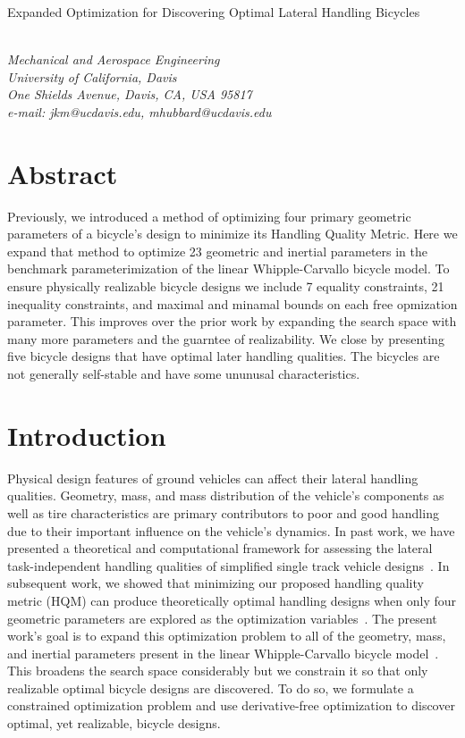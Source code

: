 \documentclass{bmd2019p}
\begin{document}
\begin{flushleft}
{\fontsize{16pt}{20pt}\selectfont%
  Expanded Optimization for Discovering Optimal Lateral Handling Bicycles}
\end{flushleft}

\begin{flushleft}
  {\\}
  \textit{Mechanical and Aerospace Engineering\\
          University of California, Davis\\
          One Shields Avenue, Davis, CA, USA 95817\\
          e-mail: jkm@ucdavis.edu, mhubbard@ucdavis.edu}
\end{flushleft}

\section*{Abstract}
%
Previously, we introduced a method of optimizing four primary geometric
parameters of a bicycle's design to minimize its Handling Quality Metric. Here
we expand that method to optimize 23 geometric and inertial parameters in the
benchmark parameterimization of the linear Whipple-Carvallo bicycle model. To
ensure physically realizable bicycle designs we include 7 equality constraints,
21 inequality constraints, and maximal and minamal bounds on each free
opmization parameter. This improves over the prior work by expanding the search
space with many more parameters and the guarntee of realizability. We close by
presenting five bicycle designs that have optimal later handling qualities. The
bicycles are not generally self-stable and have some ununusal characteristics.

\section{Introduction}
%
Physical design features of ground vehicles can affect their lateral handling
qualities. Geometry, mass, and mass distribution of the vehicle's components as
well as tire characteristics are primary contributors to poor and good handling
due to their important influence on the vehicle's dynamics. In past work, we
have presented a theoretical and computational framework for assessing the
lateral task-independent handling qualities of simplified single track vehicle
designs~\cite{Hess2012,Moore2012}. In subsequent work, we showed that
minimizing our proposed handling quality metric (HQM) can produce theoretically
optimal handling designs when only four geometric parameters are explored as
the optimization variables~\cite{Moore2016}. The present work's goal is to
expand this optimization problem to all of the geometry, mass, and inertial
parameters present in the linear Whipple-Carvallo bicycle
model~\cite{Meijaard2007}.  This broadens the search space considerably but we
constrain it so that only realizable optimal bicycle designs are discovered. To
do so, we formulate a constrained optimization problem and use derivative-free
optimization to discover optimal, yet realizable, bicycle designs.
\end{document}
